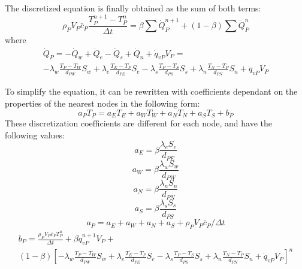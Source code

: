 The discretized equation is finally obtained as the sum of both terms:
\begin{equation}
\rho_{P}V_{P}\bar{c}_{P}\frac{T_{P}^{n+1}-T_{P}^{n}}{\Delta t}=\beta\sum\dot{Q}_{P}^{n+1}+\left(1-\beta\right)\sum\dot{Q}_{P}^{n}
\end{equation}
where
\begin{multline}
	\dot{Q}_{P}=-\dot{Q}_{w}+\dot{Q}_{e}-\dot{Q}_{s}+\dot{Q}_{n}+\dot{q}_{vP}V_{P}= \\
	-\lambda_{w}\frac{T_{P}-T_{W}}{d_{PW}}S_{w}+\lambda_{e}\frac{T_{E}-T_{P}}{d_{PE}}S_{e}-\lambda_{s}\frac{T_{P}-T_{S}}{d_{PS}}S_{s}+\lambda_{n}\frac{T_{N}-T_{P}}{d_{PN}}S_{n}+\dot{q}_{vP}V_{P}
\end{multline}

\label{DiscrCond}
To simplify the equation, it can be rewritten with coefficients dependant on the properties of the nearest nodes in the following form:
\begin{equation}
a_{P}T_{P}=a_{E}T_{E}+a_{W}T_{W}+a_{N}T_{N}+a_{S}T_{S}+b_{P}
\end{equation}
These discretization coefficients are different for each node, and have the following values:
\begin{equation}
a_{E}=\beta\frac{\lambda_{e}S_{e}}{d_{PE}}
\end{equation}
\begin{equation}
a_{W}=\beta\frac{\lambda_{w}S_{w}}{d_{PW}}
\end{equation}
\begin{equation}
a_{N}=\beta\frac{\lambda_{n}S_{n}}{d_{PN}}
\end{equation}
\begin{equation}
a_{S}=\beta\frac{\lambda_{s}S_{s}}{d_{PS}}
\end{equation}
\begin{equation}
a_{P}=a_{E}+a_{W}+a_{N}+a_{S}+\rho_{P}V_{P}\bar{c}_{P}/\Delta t
\end{equation}
\begin{multline}
b_{P}=\frac{\rho_{P}V_{P}\bar{c}_{P}T_{P}^{n}}{\Delta t}+\beta\dot{q}_{vP}^{n+1}V_{P}+ \\
\left(1-\beta\right)\left[-\lambda_{w}\frac{T_{P}-T_{W}}{d_{PW}}S_{w}+\lambda_{e}\frac{T_{E}-T_{P}}{d_{PE}}S_{e}-\lambda_{s}\frac{T_{P}-T_{S}}{d_{PS}}S_{s}+\lambda_{n}\frac{T_{N}-T_{P}}{d_{PN}}S_{n}+\dot{q}_{vP}V_{P}\right]^{n}
\end{multline}

